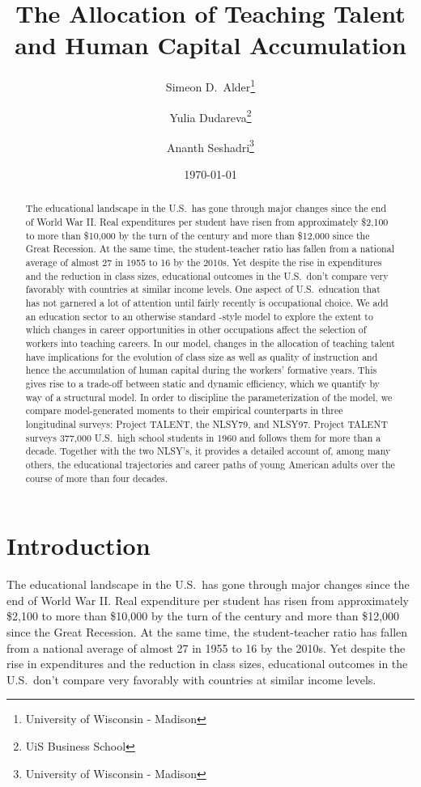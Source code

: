 \documentclass[onehalfspacing,11pt]{article}
\begin{document}
	
	\begin{titlepage}
		\title{The Allocation of Teaching Talent and Human Capital Accumulation}
		\author{Simeon D.~Alder\footnote{University of Wisconsin - Madison} \and Yulia Dudareva\footnote{UiS Business School} \and Ananth Seshadri\footnote{University of Wisconsin - Madison}}
		\date{\today}
		
		\maketitle
		
		\begin{abstract}
			The educational landscape in the U.S.~has gone through major changes since the end of World War II. Real expenditures per student have risen from approximately \$2,100 to more than \$10,000 by the turn of the century and more than \$12,000 since the Great Recession. At the same time, the student-teacher ratio has fallen from a national average of almost 27 in 1955 to 16 by the 2010s. Yet despite the rise in expenditures and the reduction in class sizes, educational outcomes in the U.S.~don't compare very favorably with countries at similar income levels. One aspect of U.S.~education that has not garnered a lot of attention until fairly recently is occupational choice. We add an education sector to an otherwise standard \cite{Hsieh:2019}-style model to explore the extent to which changes in career opportunities in other occupations affect the selection of workers into teaching careers. In our model, changes in the allocation of teaching talent have implications for the evolution of class size as well as quality of instruction and hence the accumulation of human capital during the workers' formative years. This gives rise to a trade-off between static and dynamic efficiency, which we quantify by way of a structural model. In order to discipline the parameterization of the model, we compare model-generated moments to their empirical counterparts in three longitudinal surveys: Project TALENT, the NLSY79, and NLSY97. Project TALENT surveys 377,000 U.S.~high school students in 1960 and follows them for more than a decade. Together with the two NLSY's, it provides a detailed account of, among many others, the educational trajectories and career paths of young American adults over the course of more than four decades.
		\end{abstract}
	\end{titlepage}
	
	\section{Introduction}
	The educational landscape in the U.S.~has gone through major changes since the end of World War II. Real expenditure per student has risen from approximately \$2,100 to more than \$10,000 by the turn of the century and more than \$12,000 since the Great Recession. At the same time, the student-teacher ratio has fallen from a national average of almost 27 in 1955 to 16 by the 2010s. Yet despite the rise in expenditures and the reduction in class sizes, educational outcomes in the U.S.~don't compare very favorably with countries at similar income levels.
	
\end{document}
